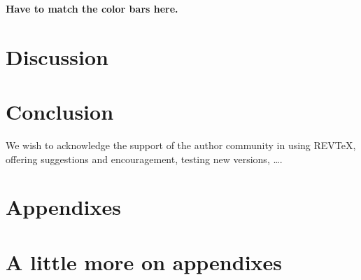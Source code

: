\documentclass[%
 reprint,
 amsmath,amssymb,
 aps,
]{revtex4-2}
\begin{document}
\textbf{Have to match the color bars here.}


\section{\label{sec:level1} Discussion}

\section{\label{sec:level1} Conclusion}







\begin{acknowledgments}
We wish to acknowledge the support of the author community in using
REV\TeX{}, offering suggestions and encouragement, testing new versions,
\dots.
\end{acknowledgments}

\appendix

\section{Appendixes}



\section{A little more on appendixes}



\nocite{*}



 \label{paper1}%

\end{document}
